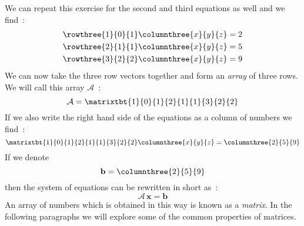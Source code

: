 We can repeat this exercise for the second and third equations as well and we find~:
\begin{align}
\rowthree{1}{0}{1}\columnthree{x}{y}{z}&=2\nonumber\\
\rowthree{2}{1}{1}\columnthree{x}{y}{z}&=5\\
\rowthree{3}{2}{2}\columnthree{x}{y}{z}&=9\nonumber
\end{align}
We can now take the three row vectors together and form an \textit{array} of three rows.
We will call this array $\mathcal{A}$~:
\begin{equation}
\mathcal{A}=\matrixtbt{1}{0}{1}{2}{1}{1}{3}{2}{2}
\end{equation}
If we also write the right hand side of the equations as a column of numbers we find~:
\begin{equation}
\matrixtbt{1}{0}{1}{2}{1}{1}{3}{2}{2}\columnthree{x}{y}{z}=\columnthree{2}{5}{9}
\end{equation}
If we denote 
\begin{equation}
\mathbf{b}=\columnthree{2}{5}{9}
\end{equation}
then the system of equations can be rewritten in short as~:
\begin{equation}
\mathcal{A}\,\mathbf{x}=\mathbf{b}
\end{equation}
An array of numbers which is obtained in this way is known as a \textit{matrix}.  
In the following paragraphs we will explore some of the common properties of matrices.

